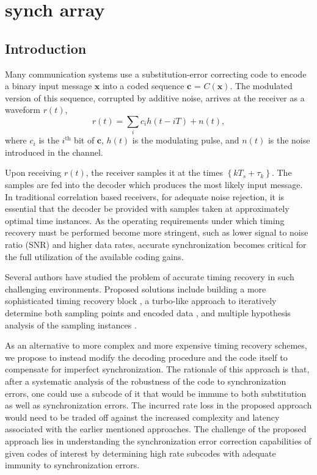 \chapter[Synch array]{synch array}
\section{Introduction}

Many communication systems use a substitution-error correcting
code to encode a binary input message $\mathbf{x}$ into a coded
sequence $\mathbf{c}$ = $C(\mathbf{x})$. The modulated version of
this sequence, corrupted by additive noise, arrives at the
receiver as a waveform $r(t)$,
\begin{equation}\label{eq:rt}
r(t)=\sum_{i} c_i h(t-iT) +n(t),
\end{equation}
where $c_i$ is the $i^{\text{th}}$ %
bit of $\mathbf{c}$, $h(t)$ is the modulating pulse, and $n(t)$ is
the noise introduced in the channel.

Upon receiving $r(t)$, the receiver samples it at the times
$\left\{kT_s+\tau_k\right\} $. The samples are fed into the
decoder which produces the most likely input message. In
traditional correlation based receivers, for adequate noise
rejection, it is essential that the decoder be provided with
samples taken at approximately optimal time instances. As the
operating requirements under which timing recovery must be
performed become more stringent, such as lower signal to noise
ratio (SNR) and higher data rates, accurate synchronization
becomes critical for the full utilization of the available coding
gains.

Several authors have studied the problem of accurate timing
recovery in such challenging environments. Proposed solutions
include building a more sophisticated timing recovery block
\cite{liu:02}, a turbo-like approach to iteratively determine both
sampling points and encoded data \cite{mcla:02}, and multiple
hypothesis analysis of the sampling instances \cite{kbek:04}.

As an alternative to more complex and more expensive timing
recovery schemes, we propose to instead modify the decoding
procedure and the code itself to compensate for imperfect
synchronization. The rationale of this approach is that, after a
systematic analysis of the robustness of the code to
synchronization errors, one could use a subcode of it that would
be immune to both substitution as well as synchronization errors.
The incurred rate loss in the proposed approach would need to be
traded off against the increased complexity and latency associated
with the earlier mentioned approaches. The challenge of the
proposed approach lies in understanding the synchronization error
correction capabilities of given codes of interest by determining
high rate subcodes with adequate immunity to synchronization
errors.

